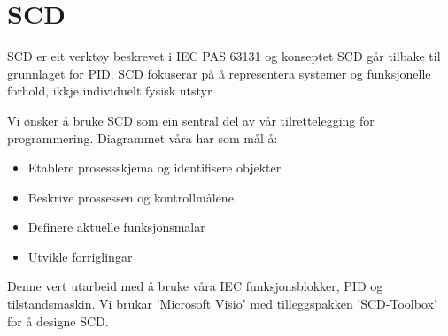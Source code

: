 \section{SCD}
\thispagestyle{fancy}


 \gls{SCD} er eit verktøy beskrevet i IEC PAS 63131 og konseptet \gls{SCD} går tilbake til grunnlaget for \gls{PID}.
 SCD fokuserar på å representera systemer og funksjonelle forhold, ikkje individuelt fysisk utstyr\citep{IEC-PAS-63131-CH4.1}

 Vi ønsker å bruke SCD som ein sentral del av vår tilrettelegging for programmering. 
 Diagrammet våra har som mål å:
 \begin{itemize}
    \item Etablere prosessskjema og identifisere objekter
    \item Beskrive prossessen og kontrollmålene
    \item Definere aktuelle funksjonsmalar
    \item Utvikle forriglingar
\end{itemize}

 Denne vert utarbeid med å bruke våra IEC funksjonsblokker, {PID} og tilstandsmaskin. 
 Vi brukar 'Microsoft Visio' med tilleggspakken 'SCD-Toolbox' for å designe SCD. 

\newpage